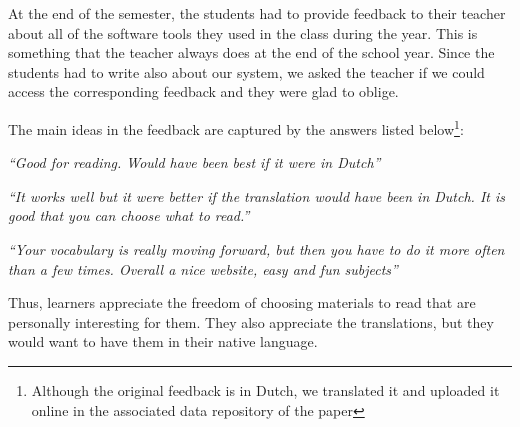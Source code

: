 

At the end of the semester, the students had to provide feedback to their teacher about all of the software tools they used in the class during the year. This is something that the teacher always does at the end of the school year. Since the students had to write also about our system, we asked the teacher if we could access the corresponding feedback and they were glad to oblige. 

The main ideas in the feedback are captured by the answers listed below\footnote{Although the original feedback is in Dutch, we translated it and uploaded it online in the associated data repository of the paper}: 

\begin{description}
  \item {\em ``Good for reading. Would have been best if it were in Dutch''}
  \item {\em ``It works well but it were better if the translation would have been in Dutch. It is good that you can choose what to read.''}
  \item {\em ``Your vocabulary is really moving forward, but then you have to do it more often than a few times. Overall a nice website, easy and fun subjects''}
\end{description}

Thus, learners appreciate the freedom of choosing materials to read that are personally interesting for them. They also appreciate the translations, but they would want to have them in their native language. 



